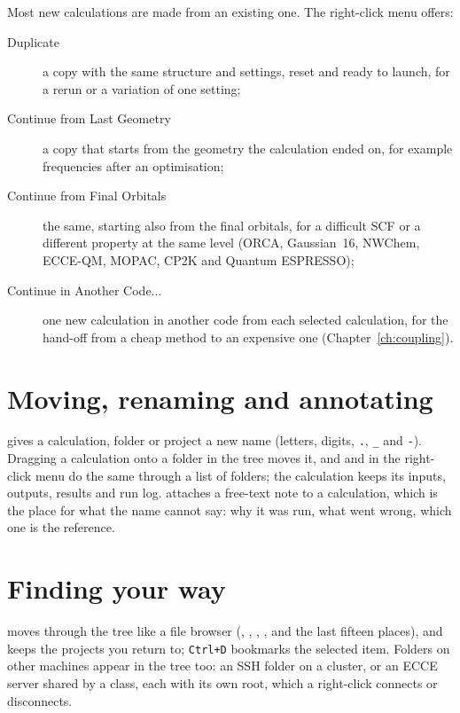Most new calculations are made from an existing one. The right-click menu  offers:
\begin{description}
	\item[Duplicate] a copy with the same structure and settings, reset and ready to launch, for a rerun or a variation of one setting;
	\item[Continue from Last Geometry] a copy that starts from the geometry the calculation ended on, for example frequencies after an optimisation;
	\item[Continue from Final Orbitals] the same, starting also from the final orbitals, for a difficult SCF or a different property at the same level (ORCA, Gaussian~16, NWChem, ECCE-QM, MOPAC, CP2K and Quantum ESPRESSO);
	\item[Continue in Another Code...] one new calculation in another code from each selected calculation, for the hand-off from a cheap method to an expensive one (Chapter~\ref{ch:coupling}).
\end{description}

\section{Moving, renaming and annotating}
 gives a calculation, folder or project a new name (letters, digits, \texttt{.}, \texttt{\_} and \texttt{-}). Dragging a calculation onto a folder in the tree moves it, and  and  in the right-click menu do the same through a list of folders; the calculation keeps its inputs, outputs, results and run log.  attaches a free-text note to a calculation, which is the place for what the name cannot say: why it was run, what went wrong, which one is the reference.

\section{Finding your way}
 moves through the tree like a file browser (, , , , and the last fifteen places), and  keeps the projects you return to; \texttt{Ctrl+D} bookmarks the selected item. Folders on other machines appear in the tree too: an SSH folder on a cluster, or an ECCE server shared by a class, each with its own root, which a right-click connects or disconnects.

